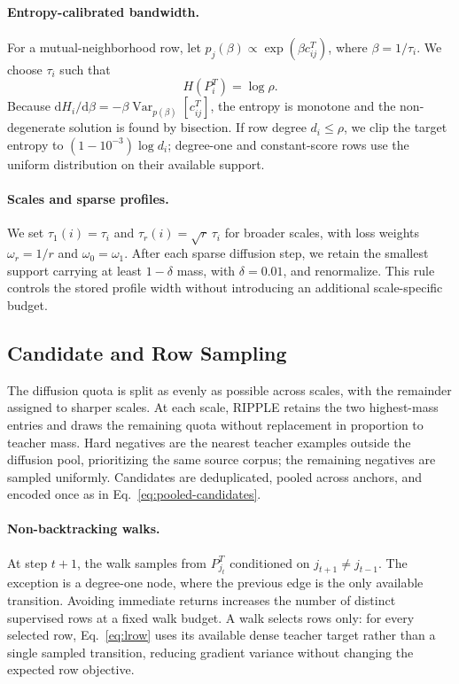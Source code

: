 \paragraph{Entropy-calibrated bandwidth.}
\label{app:entropic-bandwidth}
For a mutual-neighborhood row, let
$p_j(\beta)\propto\exp(\beta c^T_{ij})$, where $\beta=1/\tau_i$. We choose
$\tau_i$ such that
\begin{equation}
\label{eq:entropic-bandwidth}
H(P_i^T)=\log\rho.
\end{equation}
Because
$\mathrm dH_i/\mathrm d\beta=-\beta\operatorname{Var}_{p(\beta)}[c^T_{ij}]$,
the entropy is monotone and the non-degenerate solution is found by bisection.
If row degree $d_i\leq\rho$, we clip the target entropy to
$(1-10^{-3})\log d_i$; degree-one and constant-score rows use the uniform
distribution on their available support.

\paragraph{Scales and sparse profiles.}
\label{app:hyper-ladder}
We set $\tau_1(i)=\tau_i$ and $\tau_r(i)=\sqrt r\,\tau_i$ for broader
scales, with loss weights $\omega_r=1/r$ and $\omega_0=\omega_1$. After each
sparse diffusion step, we retain the smallest support carrying at least
$1-\delta$ mass, with $\delta=0.01$, and renormalize. This rule controls the
stored profile width without introducing an additional scale-specific budget.

\subsection{Candidate and Row Sampling}

The diffusion quota is split as evenly as possible across scales, with the
remainder assigned to sharper scales. At each scale, RIPPLE retains the two
highest-mass entries and draws the remaining quota without replacement in
proportion to teacher mass. Hard negatives are the nearest teacher examples
outside the diffusion pool, prioritizing the same source corpus; the remaining
negatives are sampled uniformly. Candidates are deduplicated, pooled across
anchors, and encoded once as in Eq.~\eqref{eq:pooled-candidates}.

\paragraph{Non-backtracking walks.}
\label{app:hyper-nonbacktracking}
At step $t+1$, the walk samples from $P^T_{j_t}$ conditioned on
$j_{t+1}\neq j_{t-1}$. The exception is a degree-one node, where the previous
edge is the only available transition. Avoiding immediate returns increases
the number of distinct supervised rows at a fixed walk budget. A walk selects
rows only: for every selected row, Eq.~\eqref{eq:lrow} uses its available
dense teacher target rather than a single sampled transition, reducing
gradient variance without changing the expected row objective.

